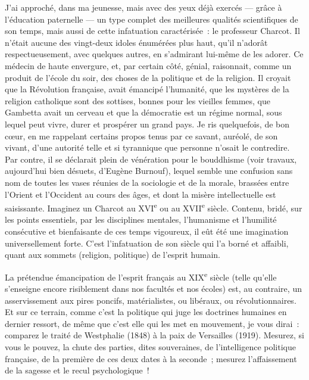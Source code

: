 \documentclass[french,twoside]{book} %
\begin{document}
J’ai approché, dans ma jeunesse, mais avec des yeux déjà exercés — grâce à l’éducation paternelle — un type complet des meilleures qualités scientifiques de son temps, mais aussi de cette infatuation caractérisée : le professeur Charcot. Il n’était aucune des vingt-deux idoles énumérées plus haut, qu’il n’adorât respectueusement, avec quelques autres, en s’admirant lui-même de les adorer. Ce médecin de haute envergure, et, par certain côté, génial, raisonnait, comme un produit de l’école du soir, des choses de la politique et de la religion. Il croyait que la Révolution française, avait émancipé l’humanité, que les mystères de la religion catholique sont des sottises, bonnes pour les vieilles femmes, que Gambetta avait un cerveau et que la démocratie est un régime normal, sous lequel peut vivre, durer et prospérer un grand pays. Je ris quelquefois, de bon cœur, en me rappelant certains propos tenus par ce savant, auréolé, de son vivant, d’une autorité telle et si tyrannique que personne n’osait le contredire. Par contre, il se déclarait plein de vénération pour le bouddhisme (voir travaux, aujourd’hui bien désuets, d’Eugène Burnouf), lequel semble une confusion sans nom de toutes les vases réunies de la sociologie et de la morale, brassées entre l’Orient et l’Occident au cours des âges, et dont la misère intellectuelle est saisissante. Imaginez un Charcot au XVI\textsuperscript{e} ou au XVII\textsuperscript{e} siècle. Contenu, bridé, sur les points essentiels, par les disciplines mentales, l’humanisme et l’humilité consécutive et bienfaisante de ces temps vigoureux, il eût été une imagination universellement forte. C’est l’infatuation de son siècle qui l’a borné et affaibli, quant aux sommets (religion, politique) de l’esprit humain.\par
La prétendue émancipation de l’esprit français au XIX\textsuperscript{e} siècle (telle qu’elle s’enseigne encore risiblement dans nos facultés et nos écoles) est, au contraire, un asservissement aux pires poncifs, matérialistes, ou libéraux, ou révolutionnaires. Et sur ce terrain, comme c’est la politique qui juge les doctrines humaines en dernier ressort, de même que c’est elle qui les met en mouvement, je vous dirai : comparez le traité de Westphalie (1848) à la paix de Versailles (1919). Mesurez, si vous le pouvez, la chute des parties, dites souveraines, de l’intelligence politique française, de la première de ces deux dates à la seconde ; mesurez l’affaissement de la sagesse et le recul psychologique !\par
\end{document}
